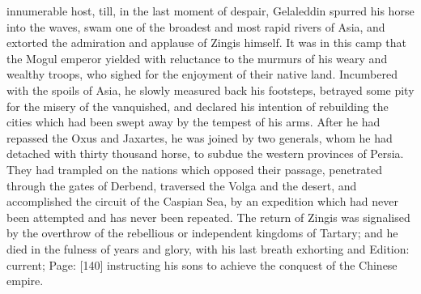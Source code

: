 innumerable host, till, in the last moment of despair, Gelaleddin spurred his horse into the waves, swam one of the broadest and most rapid rivers of Asia, and extorted the admiration and applause of Zingis himself. It was in this camp that the Mogul emperor yielded with reluctance to the murmurs of his weary and wealthy troops, who sighed for the enjoyment of their native land. Incumbered with the spoils of Asia, he slowly measured back his footsteps, betrayed some pity for the misery of the vanquished, and declared his intention of rebuilding the cities which had been swept away by the tempest of his arms. After he had repassed the Oxus and Jaxartes, he was joined by two generals, whom he had detached with thirty thousand horse, to subdue the western provinces of Persia. They had trampled on the nations which opposed their passage, penetrated through the gates of Derbend, traversed the Volga and the desert, and accomplished the circuit of the Caspian Sea, by an expedition which had never been attempted and has never been repeated. The return of Zingis was signalised by the overthrow of the rebellious or independent kingdoms of Tartary; and he died in the fulness of years and glory, with his last breath exhorting and Edition: current; Page: [140] instructing his sons to achieve the conquest of the Chinese empire.

